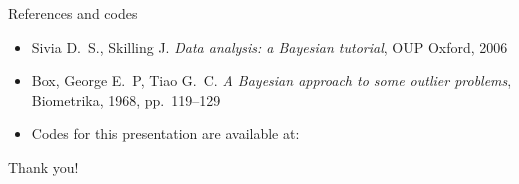 \documentclass{beamer}
\begin{document}
\begin{frame}{References and codes}
\begin{itemize}
    \item Sivia D.\ S., Skilling J. \emph{Data analysis: a Bayesian tutorial},
    OUP Oxford, 2006
    \item Box, George E.\ P, Tiao G.\ C. \emph{A Bayesian approach to some outlier problems}, Biometrika, 1968, pp.\ 119--129
    \item Codes for this presentation are available at: 
\end{itemize}
\end{frame}

\begin{frame}[standout]
\Huge
Thank you!
\end{frame}
\end{document}
